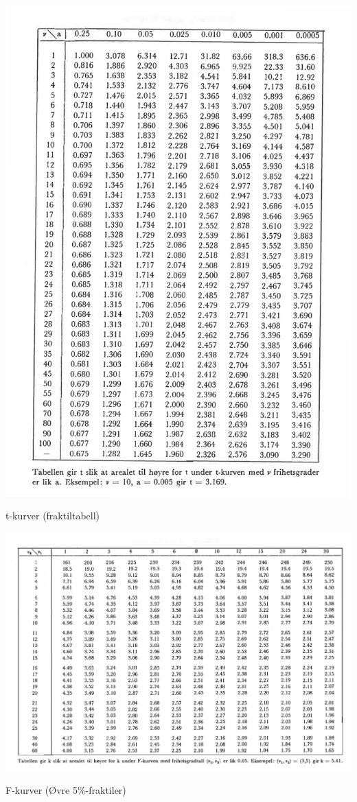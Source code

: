 \begin{table}[H]
\centering
  \includegraphics[scale=1.0]{figurer/Tabell_6_T_kurver_Fraktil.pdf}
 \caption{t-kurver (fraktiltabell)}
 \label{tab:T_kurver_Fraktil} %
\end{table}

\begin{table}[H]
\centering
  \includegraphics[scale=0.8]{figurer/Tabell_7a_F_kurver_Fraktiler_5_prosent.pdf}
 \caption{F-kurver (Øvre 5\%-fraktiler)}
 \label{tab:F_kurver_Fraktiler_5_prosent} %
\end{table}

